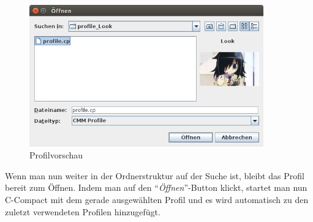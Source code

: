 \begin{figure}[h] 
   \centering
     \includegraphics[width=0.9\textwidth]{./media/images/gui/launcher/launcher_finden.png}
  \caption{ Profilvorschau}
  \label{fig:Bild1}
\end{figure}

Wenn man nun weiter in der Ordnerstruktur auf der Suche ist, bleibt das Profil bereit zum Öffnen. Indem man auf den "`\textit{Öffnen}"'-Button klickt, startet man nun C-Compact mit dem gerade ausgewählten Profil und es wird automatisch zu den zuletzt verwendeten Profilen hinzugefügt.
